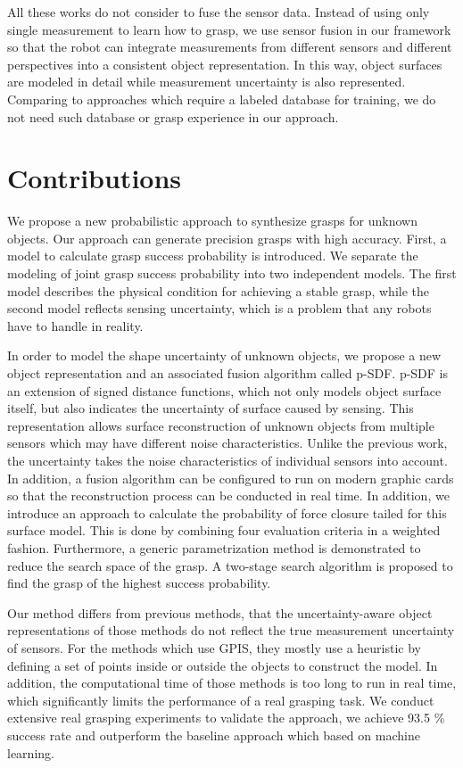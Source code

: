 All these works do not consider to fuse the sensor data. Instead of using only single measurement to learn how to grasp, we use sensor fusion in our framework so that the robot can integrate measurements from different sensors and different perspectives into a consistent object representation.  In this way, object surfaces are modeled in detail while measurement uncertainty is also represented. Comparing to approaches which require a labeled database for training, we do not need such database or grasp experience in our approach.  

\section{Contributions}
We propose a new probabilistic approach to synthesize grasps for unknown objects. Our approach can generate precision grasps with high accuracy. First, a model to calculate grasp success probability is introduced. We separate the modeling of  joint grasp success probability into two independent models. The first model describes the physical condition for achieving a stable grasp, while the second model reflects sensing uncertainty, which is a problem that any robots have to handle in reality. 

In order to model the shape uncertainty of unknown objects, we propose a new object representation and an associated fusion algorithm called p-SDF. p-SDF is an extension of signed distance functions, which not only models object surface itself, but also indicates the uncertainty of surface caused by sensing. This representation allows surface reconstruction of unknown objects from multiple sensors which may have different noise characteristics. Unlike the previous work, the uncertainty takes the noise characteristics of individual sensors into account. In addition, a fusion algorithm can be configured to run on modern graphic cards so that the reconstruction process can be conducted in real time. In addition, we introduce an approach to calculate the probability of force closure tailed for this surface model. This is done by combining four evaluation criteria in a weighted fashion. Furthermore, a generic parametrization method is demonstrated to reduce the search space of the grasp. A two-stage search algorithm is proposed to find the grasp of the highest success probability. 

Our method differs from previous methods, that the uncertainty-aware object representations of those methods do not reflect the true measurement uncertainty of sensors. For the methods which use GPIS, they mostly use a heuristic by defining a set of points inside or outside the objects to construct the model. In addition, the computational time of those methods is too long to run in real time, which significantly limits the performance of a real grasping task. We conduct extensive real grasping experiments to validate the approach, we achieve 93.5 \% success rate and outperform the baseline approach which based on machine learning. 


